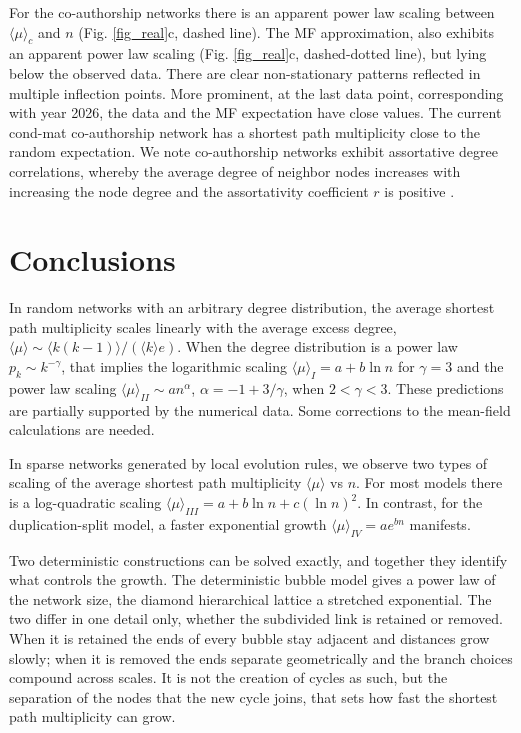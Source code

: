 \documentclass[reprint,aps,pre,amsmath,amssymb,superscriptaddress,showpacs]{revtex4-1}
\begin{document}
For the co-authorship networks there is an apparent power law scaling between $\langle \mu \rangle_c$ and $n$ (Fig. \ref{fig_real}c, dashed line). The MF approximation, also exhibits an apparent power law scaling  (Fig. \ref{fig_real}c, dashed-dotted line), but lying below the observed data. There are clear non-stationary patterns reflected in multiple inflection points. More prominent, at the last data point, corresponding with year 2026, the data and the MF expectation have close values. The current cond-mat co-authorship network has a shortest path multiplicity close to the random expectation. We note co-authorship networks exhibit assortative degree correlations, whereby the average degree of neighbor nodes increases with increasing the node degree \cite{vazquez03local} and the assortativity coefficient $r$ is positive \cite{newman02a}.

\section{Conclusions}
\label{conclusions}

In random networks with an arbitrary degree distribution, the average shortest path multiplicity scales linearly with the average excess degree, $\langle\mu\rangle \sim \langle k(k-1)\rangle/(\langle k\rangle e)$. When the degree distribution is a power law $p_k\sim k^{-\gamma}$, that implies the logarithmic scaling $\langle\mu\rangle_{I} = a + b\ln n$ for $\gamma =3$ and the power law scaling $\langle\mu\rangle_{II} \sim a n^\alpha$, $\alpha=-1+3/\gamma$, when $2<\gamma<3$. These predictions are partially supported by the numerical data. Some corrections to the mean-field calculations are needed.

In sparse networks generated by local evolution rules,  we observe two types of scaling of the average shortest path multiplicity $\langle\mu\rangle$ vs $n$. For most models there is a log-quadratic scaling $\langle\mu\rangle_{III}= a + b\ln n + c(\ln n)^2$. In contrast, for the duplication-split model, a faster exponential growth $\langle\mu\rangle_{IV} = a e^{bn}$ manifests.

Two deterministic constructions can be solved exactly, and together they identify what controls the growth. The deterministic bubble model gives a power law of the network size, the diamond hierarchical lattice a stretched exponential. The two differ in one detail only, whether the subdivided link is retained or removed. When it is retained the ends of every bubble stay adjacent and distances grow slowly; when it is removed the ends separate geometrically and the branch choices compound across scales. It is not the creation of cycles as such, but the separation of the nodes that the new cycle joins, that sets how fast the shortest path multiplicity can grow.
\end{document}
